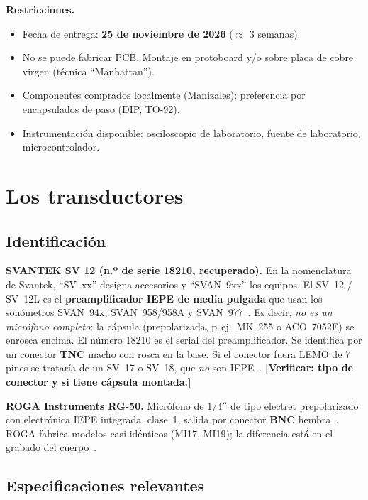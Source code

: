 \documentclass[11pt,a4paper]{article}
\newcommand{\nota}[1]{\textcolor{red!60!black}{\textbf{[#1]}}}
\begin{document}
\textbf{Restricciones.}
\begin{itemize}
  \item Fecha de entrega: \textbf{25 de noviembre de 2026} ($\approx$ 3 semanas).
  \item No se puede fabricar PCB. Montaje en protoboard y/o sobre placa de cobre virgen (técnica ``Manhattan'').
  \item Componentes comprados localmente (Manizales); preferencia por encapsulados de paso (DIP, TO-92).
  \item Instrumentación disponible: osciloscopio de laboratorio, fuente de laboratorio, microcontrolador.
\end{itemize}

\section{Los transductores}

\subsection{Identificación}

\textbf{SVANTEK SV 12 (n.º de serie 18210, recuperado).} En la nomenclatura de Svantek, ``SV~xx'' designa accesorios
y ``SVAN~9xx'' los equipos. El SV~12 / SV~12L es el \textbf{preamplificador IEPE de media pulgada} que usan los sonómetros
SVAN~94x, SVAN~958/958A y SVAN~977~\cite{svan977w,svan958a,sv977d}. Es decir, \emph{no es un micrófono completo}: la cápsula
(prepolarizada, p.\,ej.\ MK~255 o ACO~7052E) se enrosca encima. El número 18210 es el serial del preamplificador.
Se identifica por un conector \textbf{TNC} macho con rosca en la base. Si el conector fuera LEMO de 7 pines se trataría
de un SV~17 o SV~18, que \emph{no} son IEPE~\cite{sv971a}. \nota{Verificar: tipo de conector y si tiene cápsula montada.}

\textbf{ROGA Instruments RG-50.} Micrófono de $1/4''$ de tipo electret prepolarizado con electrónica IEPE integrada,
clase~1, salida por conector \textbf{BNC} hembra~\cite{rg50}. ROGA fabrica modelos casi idénticos (MI17, MI19); la
diferencia está en el grabado del cuerpo~\cite{roga14}.

\subsection{Especificaciones relevantes}
\end{document}
